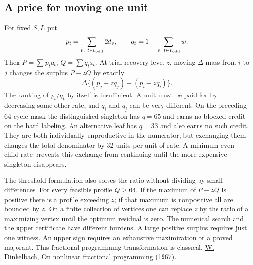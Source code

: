 \subsection{A price for moving one unit}
For fixed \(S,L\) put
\[
 p_t=\sum_{v:\ t\in v_{\rm odd}}2d_v,\qquad
 q_t=1+\sum_{v:\ t\in v_{\rm odd}}w.
\]
Then \(P=\sum p_ta_t\), \(Q=\sum q_ta_t\). At trial recovery level \(z\), moving \(\Delta\) mass from \(i\) to \(j\) changes the surplus \(P-zQ\) by exactly
\[
 \Delta\{(p_j-zq_j)-(p_i-zq_i)\}.
\]
The ranking of \(p_t/q_t\) by itself is insufficient. A unit must be paid for by decreasing some other rate, and \(q_i\) and \(q_j\) can be very different. On the preceding 64-cycle mask the distinguished singleton has \(q=65\) and earns no blocked credit on the hard labeling. An alternative leaf has \(q=33\) and also earns no such credit. They are both individually unproductive in the numerator, but exchanging them changes the total denominator by 32 units per unit of rate. A minimum even-child rate prevents this exchange from continuing until the more expensive singleton disappears.

The threshold formulation also solves the ratio without dividing by small differences. For every feasible profile \(Q\ge64\). If the maximum of \(P-zQ\) is positive there is a profile exceeding \(z\); if that maximum is nonpositive all are bounded by \(z\). On a finite collection of vertices one can replace \(z\) by the ratio of a maximizing vertex until the optimum residual is zero. The numerical search and the upper certificate have different burdens. A large positive surplus requires just one witness. An upper sign requires an exhaustive maximization or a proved majorant. This fractional-programming transformation is classical. \href{https://doi.org/10.1287/mnsc.13.7.492}{W. Dinkelbach, On nonlinear fractional programming (1967)}.
